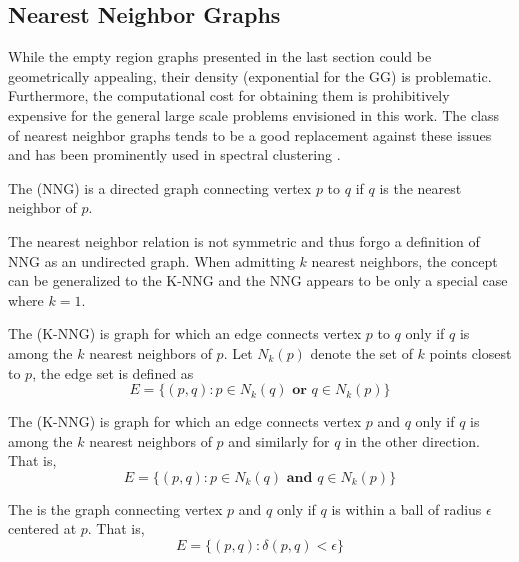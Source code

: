 \subsection{Nearest Neighbor Graphs}

While the empty region graphs presented in the last section could be geometrically appealing, their density (exponential for the GG) is problematic. Furthermore, the computational cost for obtaining them is prohibitively expensive for the general large scale problems envisioned in this work. The class of nearest neighbor graphs tends to be a good replacement against these issues and has been prominently used in spectral clustering \cite{Luxburg2007}.

\begin{defn}
The  (NNG) is a directed graph connecting vertex $p$ to $q$ if $q$ is the nearest neighbor of $p$.
\end{defn}

The nearest neighbor relation is not symmetric and thus forgo a definition of NNG as an undirected graph. When admitting $k$ nearest neighbors, the concept can be generalized to the K-NNG \cite{Miller1997} and the NNG appears to be only a special case where $k=1$.

\begin{defn}
The  (K-NNG) is graph for which an edge connects vertex $p$ to $q$ only if $q$ is among the $k$ nearest neighbors of $p$. Let $N_k(p)$ denote the set of $k$ points closest to $p$, the edge set is defined as
\begin{equation}
E = \{ (p, q) : p \in N_k(q) \textbf{ or } q \in N_k(p) \}
\end{equation}
\end{defn}

\begin{defn}
The  (K-NNG) is graph for which an edge connects vertex $p$ and $q$ only if $q$ is among the $k$ nearest neighbors of $p$ and similarly for $q$ in the other direction. That is, 
\begin{equation}
E = \{ (p, q) : p \in N_k(q) \textbf{ and } q \in N_k(p) \}
\end{equation}
\end{defn}

\begin{defn}
The  is the graph connecting vertex $p$ and $q$ only if $q$ is within a ball of radius $\epsilon$ centered at $p$. That is, 
\begin{equation}
E = \{ (p, q) : \delta(p, q) < \epsilon \}
\end{equation}
\end{defn}

